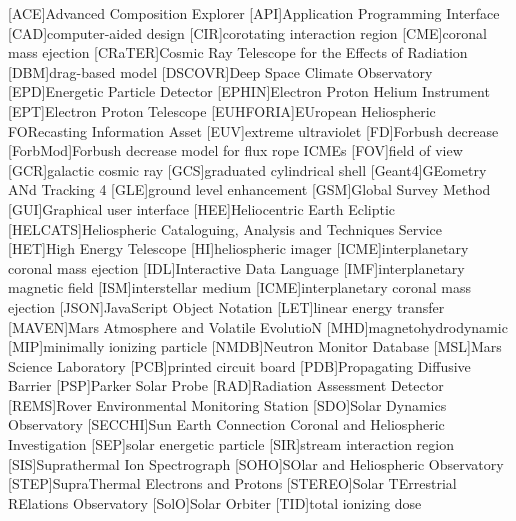 	\begin{acronym}\itemsep0pt
	[ACE]{Advanced Composition Explorer}
	[API]{Application Programming Interface}
	[CAD]{computer-aided design}
	[CIR]{corotating interaction region}
	[CME]{coronal mass ejection}
	[CRaTER]{Cosmic Ray Telescope for the Effects of Radiation}
	[DBM]{drag-based model}
	[DSCOVR]{Deep Space Climate Observatory}
	[EPD]{Energetic Particle Detector}
	[EPHIN]{Electron Proton Helium Instrument}
	[EPT]{Electron Proton Telescope}
    [EUHFORIA]{EUropean Heliospheric FORecasting Information Asset}
	[EUV]{extreme ultraviolet}
	[FD]{Forbush decrease}
	[ForbMod]{Forbush decrease model for flux rope ICMEs}
	[FOV]{field of view}
	[GCR]{galactic cosmic ray}
	[GCS]{graduated cylindrical shell}
	[Geant4]{GEometry ANd Tracking 4}
	[GLE]{ground level enhancement}
	[GSM]{Global Survey Method}
	[GUI]{Graphical user interface}
	[HEE]{Heliocentric Earth Ecliptic}
	[HELCATS]{Heliospheric Cataloguing, Analysis and Techniques Service}
	[HET]{High Energy Telescope}
	[HI]{heliospheric imager}
	[ICME]{interplanetary coronal mass ejection}
	[IDL]{Interactive Data Language}
	[IMF]{interplanetary magnetic field}
    [ISM]{interstellar medium}
	[ICME]{interplanetary coronal mass ejection}
	[JSON]{JavaScript Object Notation}
	[LET]{linear energy transfer}
	[MAVEN]{Mars Atmosphere and Volatile EvolutioN}
	[MHD]{magnetohydrodynamic}
	[MIP]{minimally ionizing particle}
	[NMDB]{Neutron Monitor Database}
	[MSL]{Mars Science Laboratory}
	[PCB]{printed circuit board}
	[PDB]{Propagating Diffusive Barrier}
	[PSP]{Parker Solar Probe}
	[RAD]{Radiation Assessment Detector}
	[REMS]{Rover Environmental Monitoring Station}
	[SDO]{Solar Dynamics Observatory}
    [SECCHI]{Sun Earth Connection Coronal and Heliospheric Investigation}
	[SEP]{solar energetic particle}
	[SIR]{stream interaction region}
	[SIS]{Suprathermal Ion Spectrograph}
	[SOHO]{SOlar and Heliospheric Observatory}
	[STEP]{SupraThermal Electrons and Protons}
	[STEREO]{Solar TErrestrial RElations Observatory}
	[SolO]{Solar Orbiter}
	[TID]{total ionizing dose}
	\end{acronym}
	

\endgroup

\cleardoublepage